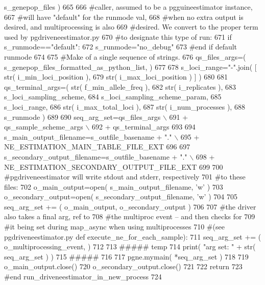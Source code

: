 \begin{DoxyCode}
      s\_genepop\_files )
665 
666     \textcolor{comment}{#caller, assumed to be a pgguineestimator instance,}
667     \textcolor{comment}{#will have "default" for the runmode val, }
668     \textcolor{comment}{#when no extra output is desired, and multiprocessing is also}
669     \textcolor{comment}{#desired.  We convert to the proper term used by pgdriveneestimator.py}
670     \textcolor{comment}{#to designate this type of run:}
671     \textcolor{keywordflow}{if} s\_runmode==\textcolor{stringliteral}{"default"}:
672         s\_runmode=\textcolor{stringliteral}{"no\_debug"}
673     \textcolor{comment}{#end if default runmode}
674 
675     \textcolor{comment}{#Make of a single sequence of strings.}
676     qs\_files\_args=( s\_genepop\_files\_formatted\_as\_python\_list, ) 
677 
678     s\_loci\_range=\textcolor{stringliteral}{"-"}.join( [ str( i\_min\_loci\_position ),
679                                 str( i\_max\_loci\_position ) ] )
680 
681     qs\_terminal\_args=( str( f\_min\_allele\_freq ), 
682                                 str( i\_replicates ), 
683                                 s\_loci\_sampling\_scheme,
684                                 s\_loci\_sampling\_scheme\_param,
685                                 s\_loci\_range,
686                                 str( i\_max\_total\_loci ),
687                                 str( i\_num\_processes ), 
688                                 s\_runmode )
689 
690     seq\_arg\_set=qs\_files\_args \(\backslash\)
691                     + qs\_sample\_scheme\_args \(\backslash\)
692                     + qs\_terminal\_args
693 
694     s\_main\_output\_filename=s\_outfile\_basename + \textcolor{stringliteral}{"."} \(\backslash\)
695             + NE\_ESTIMATION\_MAIN\_TABLE\_FILE\_EXT
696 
697     s\_secondary\_output\_filename=s\_outfile\_basename + \textcolor{stringliteral}{"."} \(\backslash\)
698             + NE\_ESTIMATION\_SECONDARY\_OUTPUT\_FILE\_EXT
699 
700     \textcolor{comment}{#pgdriveneestimator will write stdout and stderr, respectively}
701     \textcolor{comment}{#to these files:}
702     o\_main\_output=open( s\_main\_output\_filename, \textcolor{stringliteral}{'w'} )
703     o\_secondary\_output=open( s\_secondary\_output\_filename, \textcolor{stringliteral}{'w'} )
704 
705     seq\_arg\_set += ( o\_main\_output, o\_secondary\_output )
706     
707     \textcolor{comment}{#the driver also takes a final arg, ref to}
708     \textcolor{comment}{#the multiproc event -- and then checks for }
709     \textcolor{comment}{#it being set during map\_async when using multiprocesses}
710     \textcolor{comment}{#(see pgdriveneestimator.py def execute\_ne\_for\_each\_sample):}
711     seq\_arg\_set += ( o\_multiprocessing\_event, )
712 
713     \textcolor{comment}{##### temp}
714     print( \textcolor{stringliteral}{"arg set: "} + str( seq\_arg\_set ) )
715     \textcolor{comment}{#####}
716 
717     pgne.mymain( *seq\_arg\_set )
718 
719     o\_main\_output.close()
720     o\_secondary\_output.close()
721 
722     \textcolor{keywordflow}{return}
723 \textcolor{comment}{#end run\_driveneestimator\_in\_new\_process}
724 
\end{DoxyCode}
